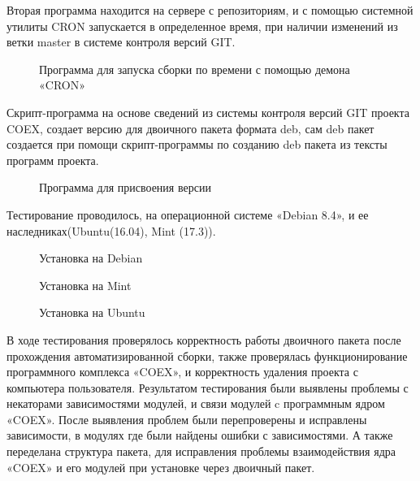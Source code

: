 Вторая программа находится на сервере с репозиториям, и с помощью системной утилиты CRON запускается в определенное время, при наличии изменений из ветки master в системе контроля версий GIT.

\begin{figure}[!ht]
\caption{ Программа  для запуска сборки по времени  с помощью демона  «CRON» }
\label{ser_2:ser_2}
\end{figure}

Скрипт-программа на основе сведений из системы контроля версий GIT проекта COEX, создает версию для двоичного пакета формата deb, сам deb пакет создается при помощи скрипт-программы по созданию  deb пакета из тексты программ проекта.

\begin{figure}[!ht]
\caption{ Программа для присвоения версии }
\label{ser_3:ser_3}
\end{figure}

Тестирование проводилось, на операционной системе «Debian 8.4», и ее наследниках(Ubuntu(16.04), Mint (17.3)).

\begin{figure}[!ht]
\caption{ Установка на Debian }
\label{ser_4:ser_4}
\end{figure}

\begin{figure}[!ht]
\caption{ Установка на Mint }
\label{ser_5:ser_5}
\end{figure}

\begin{figure}[!ht]
\caption{ Установка на Ubuntu }
\label{ser_6:ser_6}
\end{figure}

В ходе тестирования проверялось корректность работы двоичного пакета после прохождения автоматизированной сборки, также проверялась функционирование программного комплекса «COEX», и корректность удаления проекта с компьютера пользователя. Результатом тестирования были выявлены проблемы с некаторами зависимостями модулей, и связи модулей c программным ядром «COEX». После выявления проблем были перепроверены и исправлены зависимости, в модулях где были найдены ошибки с зависимостями. А также переделана структура пакета, для исправления проблемы взаимодействия ядра «COEX» и его модулей при установке через двоичный пакет.  
